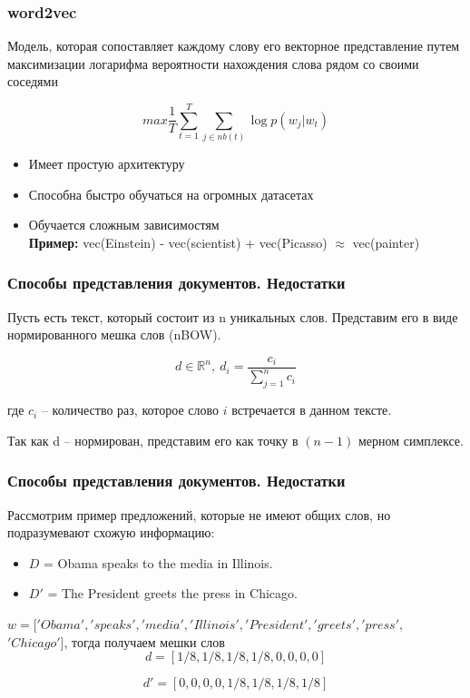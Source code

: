\documentclass{beamer}
\begin{document}

\begin{frame}
\frametitle{word2vec}
Модель, которая сопоставляет каждому слову его векторное представление путем максимизации логарифма вероятности нахождения слова рядом со своими соседями

$$
max \frac{1}{T} \sum_{t = 1}^{T} \sum_{j \in nb(t)} \log{p(w_j | w_t)}
$$

\begin{itemize}
\item Имеет простую архитектуру
\item Способна быстро обучаться на огромных датасетах
\item Обучается сложным зависимостям
\\ \textbf{Пример:}
vec(Einstein) - vec(scientist) + vec(Picasso) $\approx$ vec(painter)
\end{itemize}
\end{frame}


\begin{frame}
\frametitle{Способы представления документов. Недостатки}
Пусть есть текст, который состоит из n уникальных слов. Представим его в виде нормированного мешка слов (nBOW).

$$
d \in \mathbb{R}^{n},\ d_i = \frac{c_i}{\sum^{n}_{j = 1}c_i}
$$

где $c_i$ -- количество раз, которое слово $i$ встречается в данном тексте.

Так как d -- нормирован, представим его как точку в $(n - 1)$ мерном симплексе.

\end{frame}


\begin{frame}
\frametitle{Способы представления документов. Недостатки}

Рассмотрим пример предложений, которые не имеют общих слов, но подразумевают схожую информацию:

\begin{itemize}
\item $D$ = Obama speaks to the media in Illinois.
\item $D'$ = The President greets the press in Chicago.
\end{itemize}

$w = ['Obama', 'speaks', 'media', 'Illinois', 'President', 'greets', 'press',$ $'Chicago']$, тогда получаем мешки слов
$$
d = [1/8,1/8,1/8,1/8,0,0,0,0]
$$

$$
d' = [0,0,0,0,1/8,1/8,1/8,1/8]
$$



\end{frame}
\end{document}

